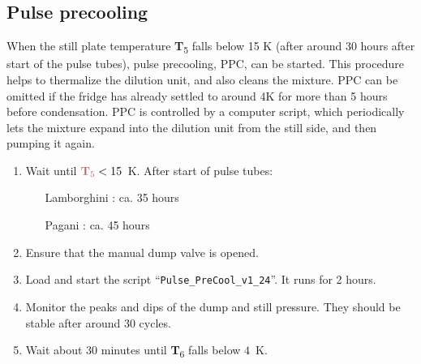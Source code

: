 \documentclass{article}[18pt,A4]
\newcommand{\temperature}[1]{{\color{temperaturecolor}\textbf{T}\textsubscript{#1}}}
\begin{document}
\subsection{Pulse precooling}
When the still plate temperature \temperature{5} falls below 15 K (after around 30 hours after start of the pulse tubes),
pulse precooling, PPC, can be started.
This procedure helps to thermalize the dilution unit, and also cleans the mixture.
PPC can be omitted if the fridge has already settled to around 4K for more than 5 hours before condensation.
PPC is controlled by a computer script,
which periodically lets the mixture expand into the dilution unit from the still side, and then pumping it again.
\begin{enumerate}
    \item Wait until $\temperature{5} < 15$~K. After start of pulse tubes:
    \begin{enumerate}
        \item[Lamborghini]: ca. 35 hours
        \item[Pagani]: ca. 45 hours
    \end{enumerate}
    \item Ensure that the manual dump valve is opened.
    \item Load and start the script ``\texttt{Pulse\_PreCool\_v1\_24}''. It runs for 2 hours.
    \item Monitor the peaks and dips of the dump and still pressure. They should be stable after around 30 cycles.
    \item Wait about 30 minutes until \temperature{6} falls below $4$~K.
\end{enumerate}
\end{document}

